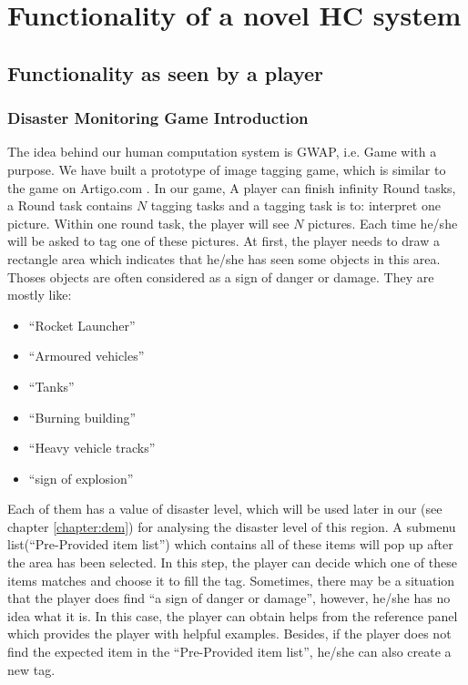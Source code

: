 \section{Functionality of a novel HC system}
  \subsection{Functionality as seen by a player}
      \subsubsection{Disaster Monitoring Game Introduction}
      The idea behind our human computation system is GWAP,
      i.e. Game with a purpose.
      We have built a prototype of image tagging game,
      which is similar to the game on Artigo.com \cite{wieser2013artigo}.
      In our game,
      A player can finish infinity Round tasks, 
      a Round task contains $N$ tagging tasks and a tagging task is to:
      interpret one picture.
      Within one round task, the player will see $N$ pictures.
      Each time he/she will be asked to tag one of these pictures.
      At first,
      the player needs to draw a rectangle area which indicates that he/she has seen some objects in this area.
      Thoses objects are often considered as a sign of danger or damage.
      They are mostly like:
      
      \begin{itemize}
        \item ``Rocket Launcher''
        \item ``Armoured vehicles''
        \item ``Tanks''
        \item ``Burning building''
        \item ``Heavy vehicle tracks''
        \item ``sign of explosion''
      \end{itemize}

      Each of them has a value of disaster level, 
      which will be used later in our (see chapter \ref{chapter:dem}) for analysing the disaster level of this region.
      A submenu list(``Pre-Provided item list'') which contains all of these items will pop up after the area has been selected.
      In this step,
      the player can decide which one of these items matches and choose it to fill the tag.
      Sometimes,
      there may be a situation that the player does find ``a sign of danger or damage'',
      however, he/she has no idea what it is.
      In this case, 
      the player can obtain helps from the reference panel which provides the player with helpful examples.
      Besides, 
      if the player does not find the expected item in the ``Pre-Provided item list'',
      he/she can also create a new tag.

